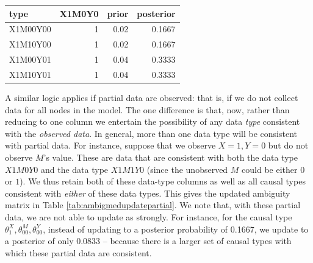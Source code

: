 \documentclass[
  12pt,
]{book}
\begin{document}
\begin{tabular}{l|r|r|r}
\hline
type & X1M0Y0 & prior & posterior\\
\hline
X1M00Y00 & 1 & 0.02 & 0.1667\\
\hline
X1M10Y00 & 1 & 0.02 & 0.1667\\
\hline
X1M00Y01 & 1 & 0.04 & 0.3333\\
\hline
X1M10Y01 & 1 & 0.04 & 0.3333\\
\hline
\end{tabular}

A similar logic applies if partial data are observed: that is, if we do not collect data for all nodes in the model. The one difference is that, now, rather than reducing to one column we entertain the possibility of any data \emph{type} consistent with the \emph{observed data}. In general, more than one data type will be consistent with partial data. For instance, suppose that we observe \(X=1, Y=0\) but do not observe \(M\)'s value. These are data that are consistent with both the data type \(X1M0Y0\) and the data type \(X1M1Y0\) (since the unobserved \(M\) could be either \(0\) or \(1\)). We thus retain both of these data-type columns as well as all causal types consistent with \emph{either} of these data types. This gives the updated ambiguity matrix in Table \ref{tab:ambigmedupdatepartial}. We note that, with these partial data, we are not able to update as strongly. For instance, for the causal type \(\theta^X_1,\theta^M_{00},\theta^Y_{00}\), instead of updating to a posterior probability of 0.1667, we update to a posterior of only 0.0833 -- because there is a larger set of causal types with which these partial data are consistent.
\end{document}
